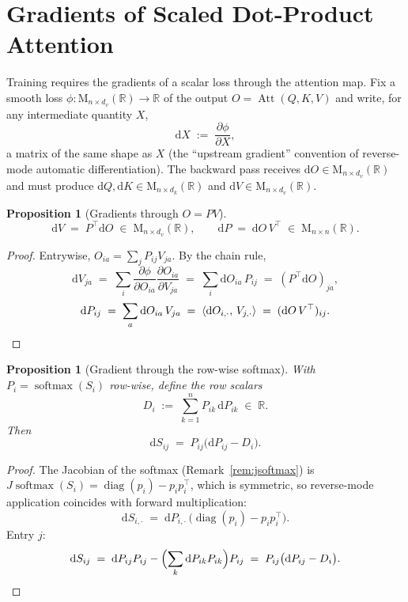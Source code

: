 \documentclass[11pt]{amsart}
\theoremstyle{plain}
\newtheorem{proposition}[theorem]{Proposition}
\theoremstyle{definition}
\newcommand{\R}{\mathbb{R}}
\newcommand{\Mat}[2]{\mathrm{M}_{#1 \times #2}(\R)}
\newcommand{\softmax}{\operatorname{softmax}}
\newcommand{\Att}{\operatorname{Att}}
\newcommand{\diag}{\operatorname{diag}}
\newcommand{\inner}[2]{\langle #1,\, #2 \rangle}
\begin{document}
\section{Gradients of Scaled Dot-Product Attention}
\label{sec:attention-gradients}

Training requires the gradients of a scalar loss through the attention map.
Fix a smooth loss $\phi : \Mat{n}{d_v} \to \R$ of the output
$O = \Att(Q,K,V)$ and write, for any intermediate quantity $X$,
\[
    \mathrm{d}X \;:=\; \frac{\partial \phi}{\partial X},
\]
a matrix of the same shape as $X$ (the ``upstream gradient'' convention of
reverse-mode automatic differentiation).  The backward pass receives
$\mathrm{d}O \in \Mat{n}{d_v}$ and must produce $\mathrm{d}Q, \mathrm{d}K \in
\Mat{n}{d_k}$ and $\mathrm{d}V \in \Mat{n}{d_v}$.

\begin{proposition}[Gradients through $O = PV$]
\label{prop:grad-pv}
\[
    \mathrm{d}V \;=\; P^\top \mathrm{d}O \;\in\; \Mat{n}{d_v},
    \qquad
    \mathrm{d}P \;=\; \mathrm{d}O\, V^\top \;\in\; \Mat{n}{n}.
\]
\end{proposition}
\begin{proof}
Entrywise, $O_{ia} = \sum_j P_{ij} V_{ja}$.  By the chain rule,
\[
    \mathrm{d}V_{ja}
    \;=\; \sum_i \frac{\partial \phi}{\partial O_{ia}}
          \frac{\partial O_{ia}}{\partial V_{ja}}
    \;=\; \sum_i \mathrm{d}O_{ia}\, P_{ij}
    \;=\; (P^\top \mathrm{d}O)_{ja},
\]
\[
    \mathrm{d}P_{ij}
    \;=\; \sum_a \mathrm{d}O_{ia}\, V_{ja}
    \;=\; \inner{\mathrm{d}O_{i,\cdot}}{V_{j,\cdot}}
    \;=\; (\mathrm{d}O\, V^\top)_{ij}.
    \qedhere
\]
\end{proof}

\begin{proposition}[Gradient through the row-wise softmax]
\label{prop:grad-softmax}
With $P_i = \softmax(S_i)$ row-wise, define the row scalars
\[
    D_i \;:=\; \sum_{k=1}^n P_{ik}\, \mathrm{d}P_{ik} \;\in\; \R.
\]
Then
\[
    \mathrm{d}S_{ij} \;=\; P_{ij}\bigl(\mathrm{d}P_{ij} - D_i\bigr).
\]
\end{proposition}
\begin{proof}
The Jacobian of the softmax (Remark~\ref{rem:jsoftmax}) is
$J\softmax(S_i) = \diag(p_i) - p_i p_i^\top$, which is symmetric, so
reverse-mode application coincides with forward multiplication:
\[
    \mathrm{d}S_{i,\cdot}
    \;=\; \mathrm{d}P_{i,\cdot}\,\bigl(\diag(p_i) - p_i p_i^\top\bigr).
\]
Entry $j$:
\[
    \mathrm{d}S_{ij}
    \;=\; \mathrm{d}P_{ij} P_{ij}
      - \Bigl(\sum_k \mathrm{d}P_{ik} P_{ik}\Bigr) P_{ij}
    \;=\; P_{ij}\bigl(\mathrm{d}P_{ij} - D_i\bigr).
    \qedhere
\]
\end{proof}
\end{document}
